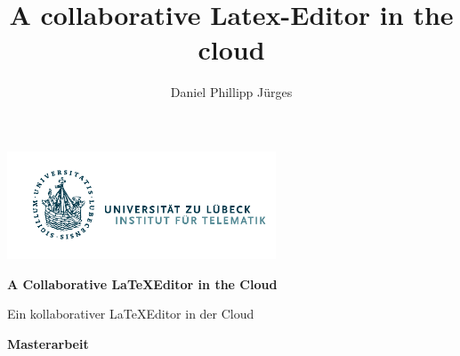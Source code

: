 

\newcommand{\titlepageskip}{\vskip 20pt}

\begin{titlepage}

\title{A collaborative Latex-Editor in the cloud}
\author{Daniel Phillipp Jürges}

{\Large
	\includegraphics[width=80mm]{images/Logo_Inst_Telematik_cropped.pdf}
	\vskip 44pt


	{\LARGE\bf A Collaborative \LaTeX Editor in the Cloud\par}
	{\LARGE Ein kollaborativer \LaTeX Editor in der Cloud\par}

	\titlepageskip
	{\bf Masterarbeit}

}
\end{titlepage}

